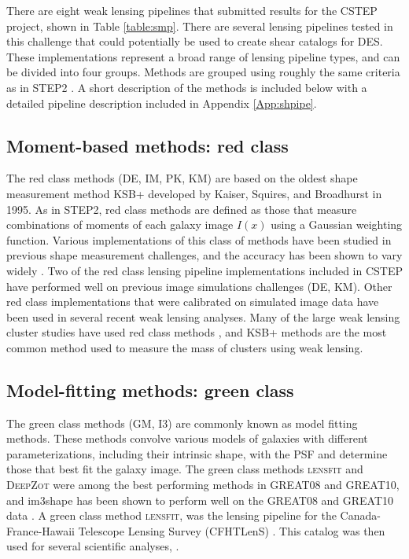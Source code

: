 There are eight weak lensing pipelines that submitted 
results for the CSTEP project, shown in Table \ref{table:smp}.
There are several lensing pipelines tested in this challenge that could potentially
be used to create shear catalogs for DES. These implementations
represent a broad range of lensing pipeline types, and can be divided
into four groups. Methods are grouped using roughly the same criteria 
as in STEP2 \citep{STEP2}. A short description of the methods is
included below with a detailed pipeline description included in
Appendix \ref{App:shpipe}.\\

\subsection{Moment-based methods: red class}
The red class methods (DE, IM, PK, KM) are based on the oldest 
shape measurement method KSB+ developed by Kaiser, Squires, and Broadhurst in 1995. As in STEP2, red class methods are
defined as those that measure combinations of
moments of each galaxy image $I(x)$ using a Gaussian 
weighting function. Various implementations
of this class of methods have been studied in previous shape
measurement challenges, and the accuracy has been shown 
to vary widely \citep{STEP2, GREAT10}.  Two of the red class lensing
pipeline implementations included in CSTEP have performed well on
previous image simulations challenges (DE, KM). Other 
red class implementations that were calibrated on
simulated image data have been used in several recent 
weak lensing analyses\citep[e.g.][]{Gruen_s, Gruen14, Apple, TS}. Many of the
large weak lensing cluster studies have used red class
methods \citep{HH,VDLinden}, and KSB+ methods are the most common
method used to measure the mass of clusters using weak lensing.
 
\subsection{Model-fitting methods: green class}
The green class methods (GM, I3) are commonly known as model fitting
methods. These methods convolve various models of galaxies with different 
parameterizations, including their intrinsic shape, with the PSF and
determine those that best fit the galaxy image. The green class methods
\textsc{lensfit} and \textsc{DeepZot} were among the best performing 
methods in GREAT08 and GREAT10, and im3shape has been shown 
to perform well on the GREAT08 and GREAT10 data \citep{Jzun}. 
A green class method \textsc{lensfit}, was 
the lensing pipeline for the Canada-France-Hawaii 
Telescope Lensing Survey (CFHTLenS) \citep{CHey}. This catalog 
was then used for several scientific analyses, \citep[e.g.][]{CH1,
  CH2, CH3}. 

